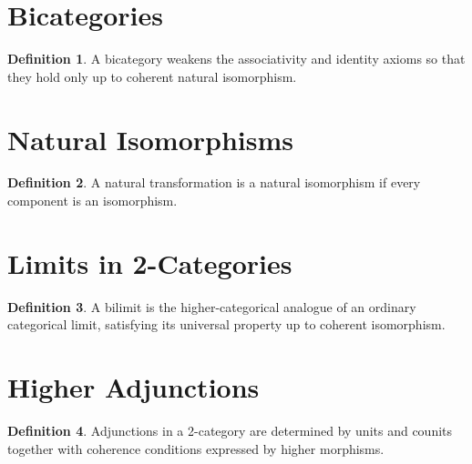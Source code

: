 \documentclass[11pt]{book}
\numberwithin{equation}{chapter}
\theoremstyle{definition}
\newtheorem{definition}{Definition}[chapter]
\theoremstyle{plain}
\begin{document}
\section{Bicategories}

\begin{definition}

A bicategory weakens the associativity and identity axioms so that they
hold only up to coherent natural isomorphism.

\end{definition}


\section{Natural Isomorphisms}

\begin{definition}

A natural transformation is a natural isomorphism if every component is
an isomorphism.

\end{definition}


\section{Limits in 2-Categories}

\begin{definition}

A bilimit is the higher-categorical analogue of an ordinary categorical
limit, satisfying its universal property up to coherent isomorphism.

\end{definition}


\section{Higher Adjunctions}

\begin{definition}

Adjunctions in a 2-category are determined by units and counits together
with coherence conditions expressed by higher morphisms.

\end{definition}
\end{document}
